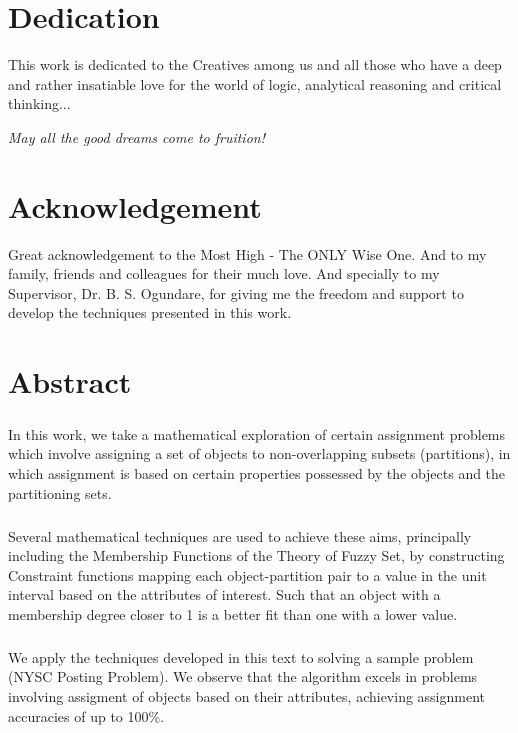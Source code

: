 \documentclass[a4paper,openany]{book}
\begin{document}
	\chapter[Dedication]{ \centering Dedication}
		This work is dedicated to the Creatives among us and all those who have a deep and rather insatiable love for the world of logic, analytical reasoning and critical thinking...
		\begin{center}
			\textit{May all the good dreams come to fruition!}
		\end{center}
	\chapter[Acknowledgement]{ \centering Acknowledgement}
		Great acknowledgement to the Most High - The ONLY Wise One. And to my family, friends and colleagues for their much love. And specially to my Supervisor, Dr. B. S. Ogundare, for giving me the freedom and support to develop the techniques presented in this work.
	\chapter[Abstract]{ \centering Abstract}
		\paragraph{}
		In this work, we take a mathematical exploration of certain assignment problems which involve assigning a set of objects to non-overlapping subsets (partitions), in which assignment is based on certain properties possessed by the objects and the partitioning sets.
		
		\paragraph{}
		Several mathematical techniques are used to achieve these aims, principally including the Membership Functions of the Theory of Fuzzy Set, by constructing Constraint functions mapping each object-partition pair to a value in the unit interval based on the attributes of interest. Such that an object with a membership degree closer to 1 is a better fit than one with a lower value.
		
		\paragraph{}
		We apply the techniques developed in this text to solving a sample problem (NYSC Posting Problem). We observe that the algorithm excels in problems involving assigment of objects based on their attributes, achieving assignment accuracies of up to 100\%.
		
\end{document}
